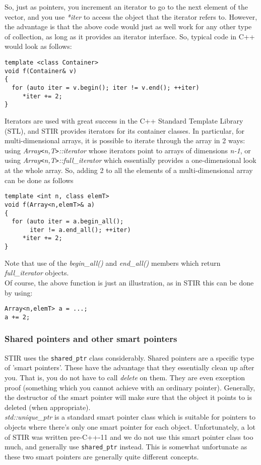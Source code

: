 \documentclass{article}
\begin{document}
So, just as pointers, you increment an iterator to go to the 
next element of the vector, and you use \textit{*iter} to access the 
object that the iterator refers to. However, the advantage is 
that the above code would just as well work for any other type 
of collection, as long as it provides an iterator interface. 
So, typical code in C++ would look as follows:

\begin{verbatim}
template <class Container>
void f(Container& v)
{
  for (auto iter = v.begin(); iter != v.end(); ++iter)
     *iter += 2;
}
\end{verbatim}


Iterators are used with great success in the C++ Standard Template 
Library (STL), and STIR provides iterators for its container 
classes. In particular, for multi-dimensional arrays, it is possible 
to iterate through the array in 2 ways: using \textit{Array\texttt{<}n,T\texttt{>}::iterator} 
whose iterators point to arrays of dimensions \textit{n-1}, or using \textit{Array\texttt{<}n,T\texttt{>}::full\_iterator} which 
essentially provides a one-dimensional look at the whole array. 
So, adding 2 to all the elements of a multi-dimensional array 
can be done as follows

\begin{verbatim}
template <int n, class elemT>
void f(Array<n,elemT>& a)
{
  for (auto iter = a.begin_all(); 
       iter != a.end_all(); ++iter)
     *iter += 2;
}
\end{verbatim}

Note that use of the \textit{begin\_all()} and \textit{end\_all()} members 
which return \textit{full\_iterator} objects. \\
Of course, the above function is just an illustration, as in 
STIR this can be done by using:


\begin{verbatim}
Array<n,elemT> a = ...;
a += 2;
\end{verbatim}


\subsubsection{
Shared pointers and other smart pointers \label{sect:sharedptr}}

STIR uses the \texttt{shared\_ptr} class considerably. Shared pointers 
are a specific type of 'smart pointers'. These have the advantage 
that they essentially clean up after you. That is, you do not 
have to call \textit{delete} on them. They are even exception proof 
(something which you cannot achieve with an ordinary pointer). 
Generally, the destructor of the smart pointer will make sure 
that the object it points to is deleted (when appropriate).\\
\textit{std::unique\_ptr} is a standard smart pointer class which is 
suitable for pointers to objects where there's only one smart 
pointer for each object. Unfortunately, a lot of STIR was written
pre-C++-11 and we do not use this smart pointer class too much, and 
generally use \texttt{shared\_ptr} instead. This is somewhat unfortunate 
as these two smart pointers are generally quite different concepts. 
\end{document}
